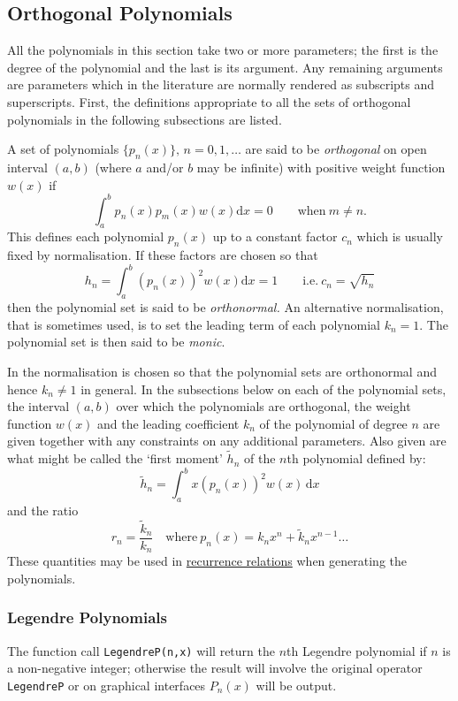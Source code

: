 \subsection{Orthogonal Polynomials}
\hypertarget{POLYFN}{}

All the polynomials in this section take two or more parameters; the first is
the degree of the polynomial and the last is its argument. Any remaining
arguments are parameters which in the literature are normally rendered as
subscripts and superscripts. First, the definitions appropriate to all the sets
of orthogonal polynomials in the following subsections are listed.

A set of polynomials $\{p_n(x)\},\, n=0,1,\ldots$
are said to be \emph{orthogonal} on open interval $(a, b)$
(where $a$ and/or $b$ may be infinite) with positive weight function $w(x)$ if
\[\int_a^b p_n(x)p_m(x)w(x) \mathrm{d}x = 0 \qquad \mbox{when}\ m \neq n.\]
This defines each polynomial $p_n(x)$ up to a constant factor $c_n$ which is
usually fixed by normalisation. If these factors are chosen so that
\[h_n=\int_a^b (p_n(x))^2 w(x) \mathrm{d}x = 1\qquad\mbox{i.e.}\
c_n=\sqrt{h_n}\]
then the polynomial set is said to be \emph{orthonormal.}
An alternative normalisation, that is sometimes used, is to set the leading term
of each polynomial $k_n = 1$. The polynomial set is then said to be
\emph{monic}.

In \REDUCE the normalisation is chosen so that the polynomial
sets are orthonormal and hence $k_n \neq 1$ in general. In the subsections below
on each of the polynomial sets, the interval $(a,b)$ over which the polynomials
are orthogonal, the weight function $w(x)$ and the leading coefficient $k_n$ of
the polynomial of degree $n$ are given together with any constraints on any
additional parameters. Also given are what might be called the `first moment'
$\tilde{h}_n$ of the $n$th polynomial defined by:
\[\tilde{h}_n = \int_a^b x  (p_n(x))^2 w(x) \,\mathrm{d}x\]
and the ratio
\[r_n = \frac{\tilde{k}_n}{k_n}\quad\mbox{where}\ p_n(x) =
k_n x^n + \tilde{k}_n x^{n-1} \ldots\]
These quantities may be used in \href{https://dlmf.nist.gov/18.2#iv}
{recurrence relations} when generating the polynomials.

\subsubsection{Legendre Polynomials}
\hypertarget{operator:LEGENDREP}{}
The function call \texttt{LegendreP(n,x)} will return the $n$th Legendre
polynomial if $n$ is a non-negative integer; otherwise the result will involve
the original operator \texttt{LegendreP} or on graphical interfaces $P_n(x)$
will be output.

